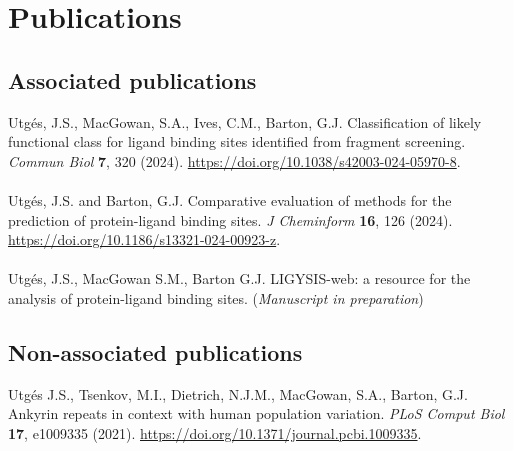 \chapter*{Publications}

\section*{Associated publications}

Utgés, J.S., MacGowan, S.A., Ives, C.M., Barton, G.J. Classification of likely functional class for ligand binding sites identified from fragment screening. \textit{Commun Biol} \textbf{7}, 320 (2024). \url{https://doi.org/10.1038/s42003-024-05970-8}.
\\\\ 
\noindent
Utgés, J.S. and Barton, G.J. Comparative evaluation of methods for the prediction of protein-ligand binding sites. \textit{J Cheminform} \textbf{16}, 126 (2024). \url{https://doi.org/10.1186/s13321-024-00923-z}.
\\\\ 
\noindent
Utgés, J.S., MacGowan S.M., Barton G.J. LIGYSIS-web: a resource for the analysis of protein-ligand binding sites. (\textit{Manuscript in preparation})

\section*{Non-associated publications}

Utgés J.S., Tsenkov, M.I., Dietrich, N.J.M., MacGowan, S.A., Barton, G.J. Ankyrin repeats in context with human population variation. \textit{PLoS Comput Biol} \textbf{17}, e1009335 (2021). \url{https://doi.org/10.1371/journal.pcbi.1009335}.